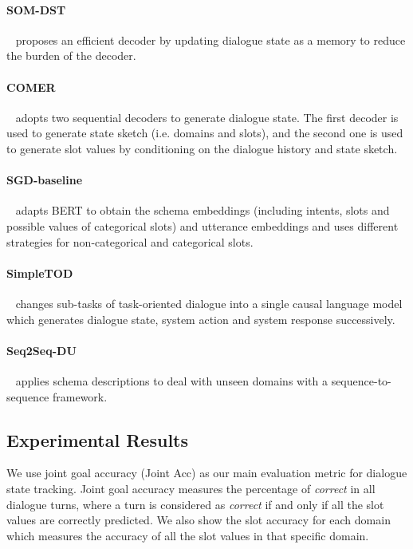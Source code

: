 \documentclass[11pt]{article}
\begin{document}
\paragraph{SOM-DST}~\citep{kim-etal-2020-efficient} proposes an efficient decoder by updating dialogue state as a memory to reduce the burden of the decoder.
\paragraph{COMER}~\citep{ren-etal-2019-scalable} adopts two sequential decoders to generate dialogue state. The first decoder is used to generate state sketch (i.e. domains and slots), and the second one is used to generate slot values by conditioning on the dialogue history and state sketch.
\paragraph{SGD-baseline}~\citep{Rastogi_Zang_Sunkara_Gupta_Khaitan_2020} adapts BERT to obtain the schema embeddings (including intents, slots and possible values of categorical slots) and utterance embeddings and uses different strategies for non-categorical and categorical slots.
\paragraph{SimpleTOD}~\citep{NEURIPS2020_e9462095} changes sub-tasks of task-oriented dialogue into a single causal language model which generates dialogue state, system action and system response successively.
\paragraph{Seq2Seq-DU}~\citep{feng-etal-2021-sequence} applies schema descriptions to deal with unseen domains with a sequence-to-sequence framework.

\subsection{Experimental Results}
We use joint goal accuracy (Joint Acc) as our main evaluation metric for dialogue state tracking. Joint goal accuracy measures the percentage of \textit{correct} in all dialogue turns, where a turn is considered as \textit{correct} if and only if all the slot values are correctly predicted. We also show the slot accuracy for each domain which measures the accuracy of all the slot values in that specific domain.
\end{document}
